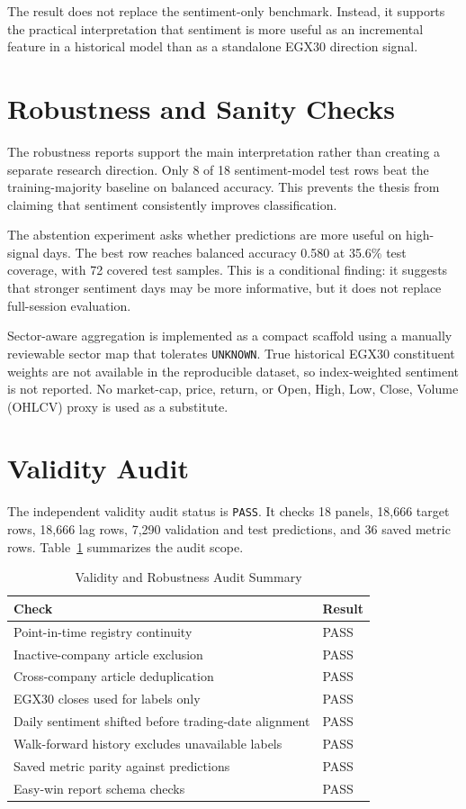 The result does not replace the sentiment-only benchmark. Instead, it supports the practical interpretation that sentiment is more useful as an incremental feature in a historical model than as a standalone EGX30 direction signal.

\section{Robustness and Sanity Checks}

The robustness reports support the main interpretation rather than creating a separate research direction. Only 8 of 18 sentiment-model test rows beat the training-majority baseline on balanced accuracy. This prevents the thesis from claiming that sentiment consistently improves classification.

The abstention experiment asks whether predictions are more useful on high-signal days. The best row reaches balanced accuracy 0.580 at 35.6\% test coverage, with 72 covered test samples. This is a conditional finding: it suggests that stronger sentiment days may be more informative, but it does not replace full-session evaluation.

Sector-aware aggregation is implemented as a compact scaffold using a manually reviewable sector map that tolerates \texttt{UNKNOWN}. True historical EGX30 constituent weights are not available in the reproducible dataset, so index-weighted sentiment is not reported. No market-cap, price, return, or Open, High, Low, Close, Volume (OHLCV) proxy is used as a substitute.

\section{Validity Audit}

The independent validity audit status is \texttt{PASS}. It checks 18 panels, 18,666 target rows, 18,666 lag rows, 7,290 validation and test predictions, and 36 saved metric rows. Table~\ref{tab:validity_summary} summarizes the audit scope.

\begin{table}[!htbp]
\centering
\caption{Validity and Robustness Audit Summary}
\label{tab:validity_summary}
\small
\begin{tabular}{ll}
\toprule
Check & Result \\
\midrule
Point-in-time registry continuity & PASS \\
Inactive-company article exclusion & PASS \\
Cross-company article deduplication & PASS \\
EGX30 closes used for labels only & PASS \\
Daily sentiment shifted before trading-date alignment & PASS \\
Walk-forward history excludes unavailable labels & PASS \\
Saved metric parity against predictions & PASS \\
Easy-win report schema checks & PASS \\
\bottomrule
\end{tabular}
\end{table}
\FloatBarrier

